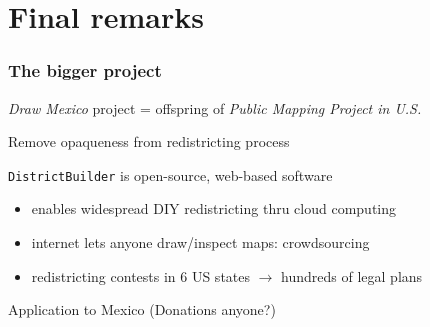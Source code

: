 \documentclass[xcolor=dvipsnames]{beamer}  %
\begin{document}
\section{Final remarks}
\begin{frame}\label{fr:MxMapProj}                      %

    \frametitle{The bigger project}

\emph{Draw Mexico} project = offspring of \emph{Public Mapping Project in U.S.}

\bigskip

Remove opaqueness from redistricting process 

\bigskip

\texttt{DistrictBuilder} is open-source, web-based software %

\begin{itemize}

\item enables widespread DIY redistricting thru cloud computing

\item  internet lets anyone draw/inspect maps: crowdsourcing

\item redistricting contests in 6 US states $\rightarrow$ hundreds of legal plans

\end{itemize}

\bigskip

Application to \alert{Mexico} \href{http://23.21.151.172/}{} (Donations anyone?) 

\end{frame}
\end{document}
